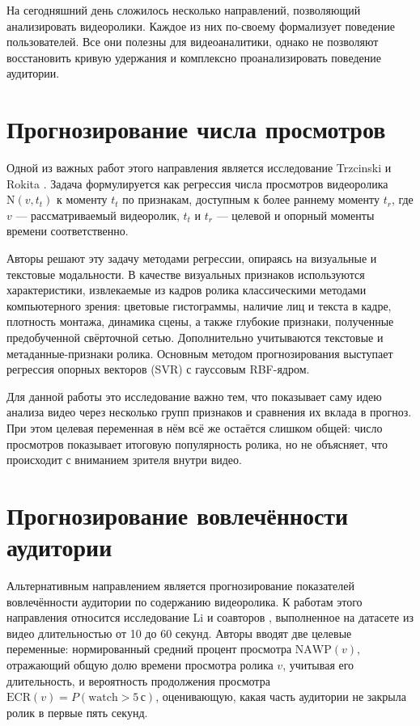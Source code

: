 \documentclass[times]{itmo-student-thesis}
\begin{document}
На сегодняшний день сложилось несколько направлений,  позволяющий анализировать видеоролики. Каждое из них по-своему формализует поведение пользователей. Все они полезны для видеоаналитики, однако не позволяют восстановить кривую удержания и комплексно проанализировать поведение аудитории.

\section{Прогнозирование числа просмотров}

Одной из важных работ этого направления является исследование Trzcinski и Rokita \cite{trzcinski2017popularity}. Задача формулируется как регрессия числа просмотров видеоролика $\mathrm{N}(v,t_t)$ к моменту $t_t$ по признакам, доступным к более раннему моменту $t_r$, где $v$ — рассматриваемый видеоролик, $t_t$ и $t_r$ — целевой и опорный моменты времени соответственно.

Авторы решают эту задачу методами регрессии, опираясь на визуальные и текстовые модальности. В качестве визуальных признаков используются характеристики, извлекаемые из кадров ролика классическими методами компьютерного зрения: цветовые гистограммы, наличие лиц и текста в кадре, плотность монтажа, динамика сцены, а также глубокие признаки, полученные предобученной свёрточной сетью. Дополнительно учитываются текстовые и метаданные-признаки ролика. Основным методом прогнозирования выступает регрессия опорных векторов (SVR) с гауссовым RBF-ядром.

Для данной работы это исследование важно тем, что показывает саму идею анализа видео через несколько групп признаков и сравнения их вклада в прогноз. При этом целевая переменная в нём всё же остаётся слишком общей: число просмотров показывает итоговую популярность ролика, но не объясняет, что происходит с вниманием зрителя внутри видео.

\section{Прогнозирование вовлечённости аудитории}

Альтернативным направлением является прогнозирование показателей вовлечённости аудитории по содержанию видеоролика. К работам этого направления относится исследование Li и соавторов \cite{li2024delving}, выполненное на датасете из видео длительностью от 10 до 60 секунд. Авторы вводят две целевые переменные: нормированный средний процент просмотра $\mathrm{NAWP}(v)$, отражающий общую долю времени просмотра ролика $v$, учитывая его длительность, и вероятность продолжения просмотра $\mathrm{ECR}(v)=P(\mathrm{watch}>5\,\text{с})$, оценивающую, какая часть аудитории не закрыла ролик в первые пять секунд.
\end{document}
